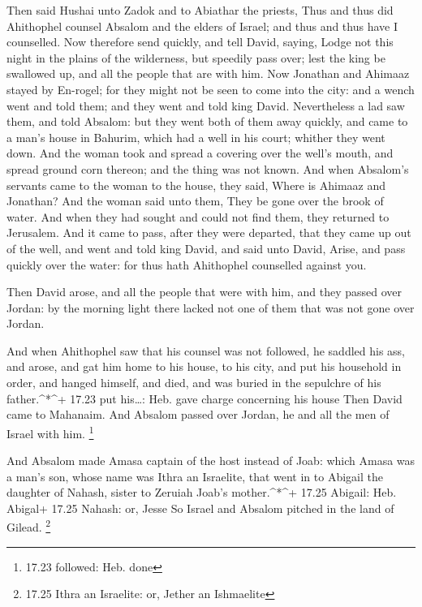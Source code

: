  Then said Hushai unto Zadok and to Abiathar the priests,
Thus and thus did Ahithophel counsel Absalom and the elders of Israel;
and thus and thus have I counselled.  Now therefore send
quickly, and tell David, saying, Lodge not this night in the plains of
the wilderness, but speedily pass over; lest the king be swallowed up,
and all the people that are with him.  Now Jonathan and
Ahimaaz stayed by En-rogel; for they might not be seen to come into the
city: and a wench went and told them; and they went and told king David.
 Nevertheless a lad saw them, and told Absalom: but they
went both of them away quickly, and came to a man's house in Bahurim,
which had a well in his court; whither they went down.  And
the woman took and spread a covering over the well's mouth, and spread
ground corn thereon; and the thing was not known.  And when
Absalom's servants came to the woman to the house, they said, Where is
Ahimaaz and Jonathan? And the woman said unto them, They be gone over
the brook of water. And when they had sought and could not find them,
they returned to Jerusalem.  And it came to pass, after
they were departed, that they came up out of the well, and went and told
king David, and said unto David, Arise, and pass quickly over the water:
for thus hath Ahithophel counselled against you.

 Then David arose, and all the people that were with him,
and they passed over Jordan: by the morning light there lacked not one
of them that was not gone over Jordan.

 And when Ahithophel saw that his counsel was not followed,
he saddled his ass, and arose, and gat him home to his house, to his
city, and put his household in order, and hanged himself, and died, and
was buried in the sepulchre of his father.\^{}*\^{}+ 17.23 put
his\ldots: Heb. gave charge concerning his house  Then
David came to Mahanaim. And Absalom passed over Jordan, he and all the
men of Israel with him. \footnote{17.23 followed: Heb. done}

 And Absalom made Amasa captain of the host instead of
Joab: which Amasa was a man's son, whose name was Ithra an Israelite,
that went in to Abigail the daughter of Nahash, sister to Zeruiah Joab's
mother.\^{}*\^{}+ 17.25 Abigail: Heb. Abigal+ 17.25 Nahash: or, Jesse
 So Israel and Absalom pitched in the land of Gilead.
\footnote{17.25 Ithra an Israelite: or, Jether an Ishmaelite}

